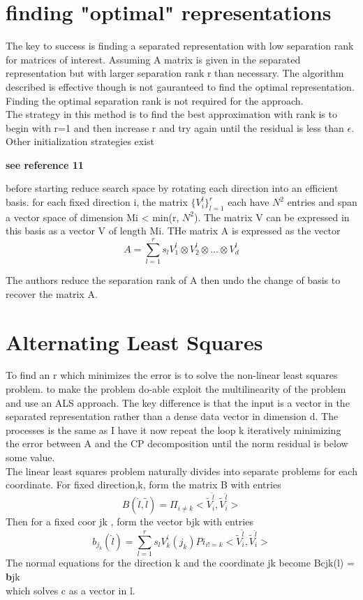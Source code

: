 \documentclass[10pt, draft]{article}
\begin{document}
\section{finding "optimal" representations}

The key to success is finding a separated representation with low separation rank for matrices of interest.  Assuming A matrix is given in the separated representation but with larger separation rank r than necessary.  The algorithm described is effective though is not gauranteed to find the optimal representation.  Finding the optimal separation rank is not required for the approach. \\
The strategy in this method is to find the best approximation with rank is to begin with r=1 and then increase r and try again until the residual is less than $\epsilon$.  Other initialization strategies exist \linebreak[1]

\textbf{see reference 11}\linebreak[1]

before starting reduce search space by rotating each direction into an efficient basis.  for each fixed direction i, the matrix $\{V_i^l\}^r_{l=1}$ each have $N^2$ entries and span a vector space of dimension Mi < min(r, $N^2$).  The matrix V can be expressed in this basis as a vector V of length Mi.  THe matrix A is expressed as the vector 
\[A = \sum_{l=1}^r s_l V_1^l \otimes V_2^l \otimes ... \otimes V_d^l \]

The authors reduce the separation rank of A then undo the change of basis to recover the matrix A.


\section{Alternating Least Squares}
To find an r which minimizes the error is to solve the non-linear least squares problem.  to make the problem do-able exploit the multilinearity of the problem and use an ALS approach.  The key difference is that the input is a vector in the separated representation rather than a dense data vector in dimension d.  The processes is the same as I have it now repeat the loop k iteratively minimizing the error between A and the CP decomposition until the norm residual is below some value.  \\
The linear least squares problem naturally divides into separate problems for each coordinate. For fixed direction,k, form the matrix B with entries
\[B(\hat{l},\tilde{l}) = \Pi_{i \neq k} <\tilde{V}_{i} ^{\tilde{l}} , \tilde{V}_{i} ^{\hat{l}} > \]
Then for a fixed coor jk , form the vector bjk with entries 
\[b_{j_k}(\hat{l}) = \sum_{l=1}^r s_l V_k^((j_k) Pi_{i != k} <\tilde{V}_i^{\tilde{l}} , \tilde{V}_i^{\hat{l}} > \]
The normal equations for the direction k and the coordinate jk become Bcjk(l) = \textbf{b}jk\\
which solves c as a vector in l.  
 
\end{document}
